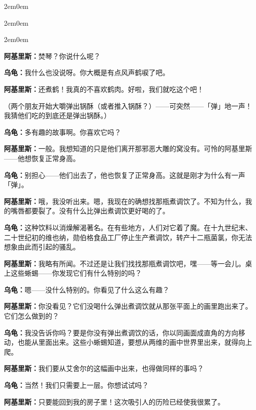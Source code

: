 \documentclass[
  12pt,
  twoside,
  openright,
  oldfontcommands,
]{memoir}
\newcommand{\dialogname}[1]{{\heifamily\bfseries #1}}
\begin{document}
\begin{adjustwidth}{2em}{0em}

\begin{adjustwidth}{2em}{0em}

\begin{adjustwidth}{2em}{0em}

\dialogname{阿基里斯：}焚琴？你说什么呢？

\dialogname{乌龟：}我什么也没说呀。你大概是有点风声鹤唳了吧。

\dialogname{阿基里斯：}还煮鹤！我真的不喜欢鹤肉。好啦，我们就吃这个吧！

（两个朋友开始大嚼弹出锅酥（或者推入锅酥？）------可突然------「弹」地一声！我猜他们吃的到底还是弹出锅酥。）

\end{adjustwidth}

\dialogname{乌龟：}多有趣的故事啊。你喜欢它吗？

\dialogname{阿基里斯：}一般。我想知道的只是他们离开那邪恶大雕的窝没有。可怜的阿基里斯------他想恢复正常身高。

\dialogname{乌龟：}别担心------他们出去了，他也恢复了正常身高。这就是刚才为什么有一声「弹」。

\dialogname{阿基里斯：}哦，我没听出来。嗯，我现在的确想找那瓶煮调饮了。不知为什么，我的嘴唇都要裂了。没有什么比弹出煮调饮更好喝的了。

\dialogname{乌龟：}这种饮料以消燥解渴著名。在有些地方，人们对它着了魔。在十九世纪末、二十世纪初的维也纳，勋伯格食品工厂停止生产煮调饮，转产十二瓶菌氯，你无法想象由此而引起的骚乱。

\dialogname{阿基里斯：}我略有所闻。不过还是让我们找找那瓶煮调饮吧，嘿------等一会儿。桌上这些蜥蜴------你发现它们有什么特别的吗？

\dialogname{乌龟：}嗯------没什么特别的。你看见了什么这么有趣？

\dialogname{阿基里斯：}你没看见？它们没喝什么弹出煮调饮就从那张平面上的画里跑出来了。它们怎么做到的？

\dialogname{乌龟：}我没告诉你吗？要是你没有弹出煮调饮的话，你以同画面成直角的方向移动，也能从里面出来。这些小蜥蜴知道，要想从两维的画中世界里出来，就得向上爬。

\dialogname{阿基里斯：}我们要从艾舍尔的这幅画中出来，也得做同样的事吗？

\dialogname{乌龟：}当然！我们只需要上一层。你想试试吗？

\dialogname{阿基里斯：}只要能回到我的房子里！这次吸引人的历险已经使我很累了。


\end{adjustwidth}
\end{adjustwidth}
\end{document}
